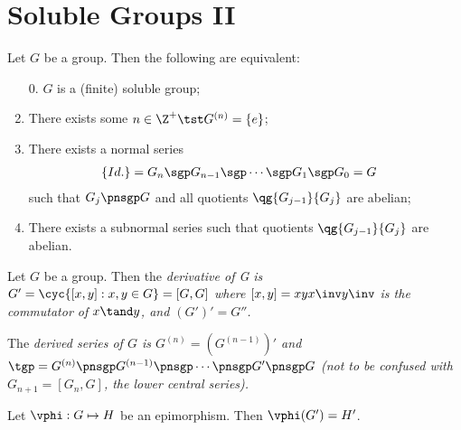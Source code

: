 \documentclass[a4paper]{article}
\begin{document}
\section{Soluble Groups II}
\begin{ttheorem}
  Let \( G \) be a group.
  Then the following are equivalent:
  \begin{enumerate}
    \item[0.] \( G \) is a (finite) soluble group;
    \item There exists some \( n\in \Z^{+} \tst G^{(n)} = \left\{ e \right\} \);
    \item There exists a normal series \begin{align*}
      \left\{ Id. \right\} &= G_n \sgp G_{n-1} \sgp \cdots \sgp G_1 \sgp G_0 = G
    \end{align*}
    such that \( G_j \pnsgp G \) and all quotients \( \qg{G_{j-1}}{G_j} \) are abelian;
    \item There exists a subnormal series such that quotients \( \qg{G_{j-1}}{G_j} \) are abelian.
  \end{enumerate}
\end{ttheorem}

\begin{tdefinition}
  Let \( G \) be a group.
  Then the \it{derivative of G} is \( G' = \cyc{[x,y] : x,y\in G} = [G,G] \) where \( [x,y] = xyx\inv y\inv \) is the \it{commutator} of \( x\tand y \), and \( (G')' = G'' \).
\end{tdefinition}



\begin{tdefinition}
  The \it{derived series} of \( G \) is \( G^{(n)} = \left( G^{(n-1)} \right)' \) and \( \tgp = G^{(n)} \pnsgp G^{(n-1)} \pnsgp \cdots \pnsgp G' \pnsgp G \) (not to be confused with \( G_{n+1} = [G_n, G]\), the \it{lower central series}).
\end{tdefinition}

\begin{tlemma}
  Let \( \vphi:G\mapsto H \) be an epimorphism.
  Then \( \vphi(G') = H' \).
\end{tlemma}
\end{document}
